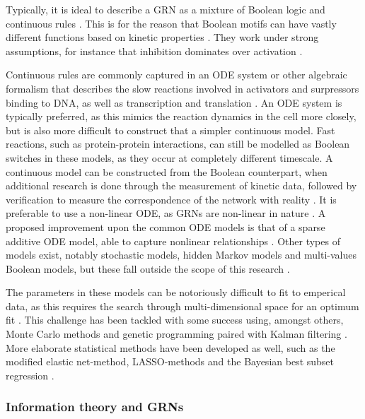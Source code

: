 \documentclass[../main.tex]{subfiles}
\begin{document}
Typically, it is ideal to describe a GRN as a mixture of Boolean logic and continuous rules \cite{bolouri2002modeling}.
This is for the reason that Boolean motifs can have vastly different functions based on kinetic properties \cite{ingram2006network}.
They work under strong assumptions, for instance that inhibition dominates over activation \cite{}.

Continuous rules are commonly captured in an ODE system or other algebraic formalism that describes the slow reactions involved in activators and surpressors binding to DNA, as well as transcription and translation \cite{ingram2006network}.
An ODE system is typically preferred, as this mimics the reaction dynamics in the cell more closely, but is also more difficult to construct that a simpler continuous model.
Fast reactions, such as protein-protein interactions, can still be modelled as Boolean switches in these models, as they occur at completely different timescale.
A continuous model can be constructed  from the Boolean counterpart, when additional research is done through the measurement of kinetic data, followed by verification to measure the correspondence of the network with reality \cite{bolouri2002modeling}.
It is preferable to use a non-linear ODE, as GRNs are non-linear in nature \cite{qian2008inference, tyson2003sniffers}.
A proposed improvement upon the common ODE models is that of a sparse additive ODE model, able to capture nonlinear relationships \cite{wu2014sparse}.
Other types of models exist, notably stochastic models, hidden Markov models and multi-values Boolean models, but these fall outside the scope of this research \cite{bolouri2002modeling, wu2014sparse}.

The parameters in these models can be notoriously difficult to fit to emperical data, as this requires the search through multi-dimensional space for an optimum fit \cite{bolouri2002modeling, kuhn2009monte}.
This challenge has been tackled with some success using, amongst others, Monte Carlo methods and genetic programming paired with Kalman filtering \cite{qian2008inference, kuhn2009monte}.
More elaborate statistical methods have been developed as well, such as the modified elastic net-method, LASSO-methods and the Bayesian best subset regression \cite{greenfield2013robust, wu2014sparse}.

\subsubsection{Information theory and GRNs}
\end{document}
